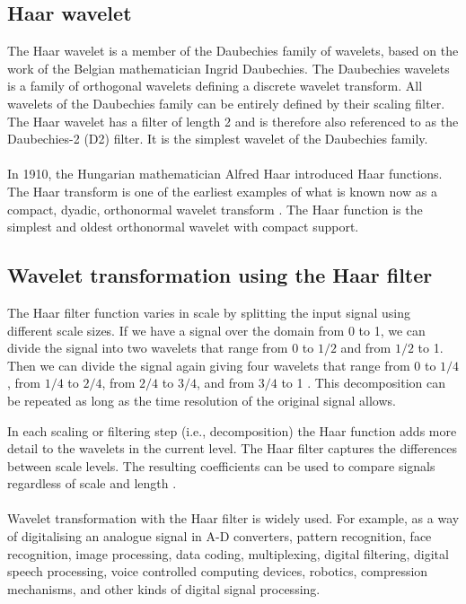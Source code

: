 \subsection{Haar wavelet}
The Haar wavelet is a member of the Daubechies family of wavelets, based on the
work of the Belgian mathematician Ingrid Daubechies. The Daubechies wavelets is
a family of orthogonal wavelets defining a discrete wavelet transform. All
wavelets of the Daubechies family can be entirely defined by their scaling
filter. The Haar wavelet has a filter of length 2 and is therefore also
referenced to as the Daubechies-2 (D2) filter. It is the simplest wavelet of
the Daubechies family.



\paragraph{}
In 1910, the Hungarian mathematician Alfred Haar introduced Haar functions. The
Haar transform is one of the earliest examples of what is known now as a
compact, dyadic, orthonormal wavelet transform \cite{stankovic}. The Haar
function is the simplest and oldest orthonormal wavelet with compact support.

\subsection{Wavelet transformation using the Haar filter}
The Haar filter function varies in scale by splitting the input signal using
different scale sizes. If we have a signal over the domain from 0 to 1, we can
divide the signal into two wavelets that range from 0 to $1/2$ and from
$1/2$ to 1. Then we can divide the signal again giving four wavelets that range
from 0 to $1/4$, from $1/4$ to $2/4$, from $2/4$ to $3/4$, and from $3/4$ to 1
\cite{graps}. This decomposition can be repeated as long as the time resolution
of the original signal allows.

In each scaling or filtering step (i.e., decomposition) the Haar function adds
more detail to the wavelets in the current level. The Haar filter captures the
differences between scale levels. The resulting coefficients can be used to
compare signals regardless of scale and length \cite{graps}.

\paragraph{}
Wavelet transformation with the Haar filter is widely used. For example, as a
way of digitalising an analogue signal in A-D converters, pattern recognition,
face recognition, image processing, data coding, multiplexing, digital
filtering, digital speech processing, voice controlled computing devices,
robotics, compression mechanisms, and other kinds of digital signal processing.

